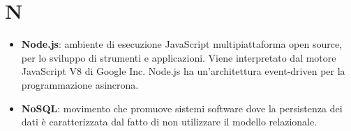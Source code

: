 \newpage
\section{N}

\begin{itemize}
	\item \textbf{Node.js}: ambiente di esecuzione JavaScript multipiattaforma open source, per lo sviluppo di strumenti e applicazioni. Viene interpretato dal motore JavaScript V8 di Google Inc. Node.js ha un'architettura event-driven per la programmazione asincrona.
	\item \textbf{NoSQL}: movimento che promuove sistemi software dove la persistenza dei dati è caratterizzata dal fatto di non utilizzare il modello relazionale.
\end{itemize}

